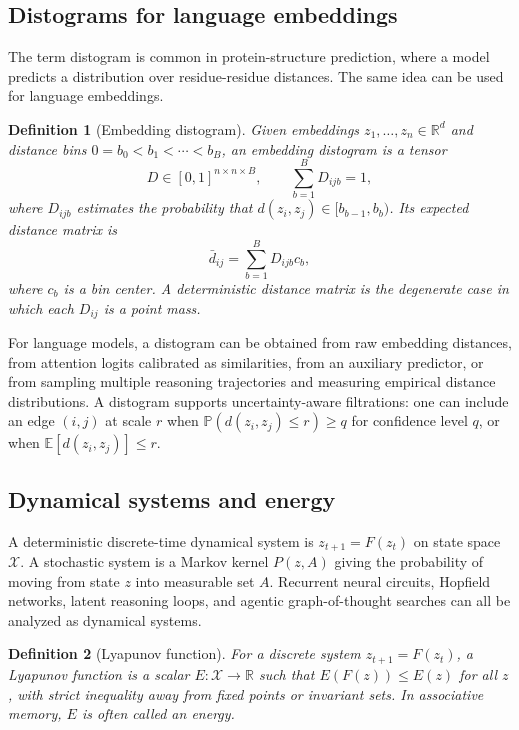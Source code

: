 \documentclass[11pt]{article}
\newtheorem{definition}{Definition}[section]
\newcommand{\R}{\mathbb{R}}
\newcommand{\E}{\mathbb{E}}
\newcommand{\calX}{\mathcal{X}}
\newcommand{\1}{\mathbf{1}}
\begin{document}
\subsection{Distograms for language embeddings}

The term distogram is common in protein-structure prediction, where a model predicts a distribution over residue-residue distances. The same idea can be used for language embeddings.

\begin{definition}[Embedding distogram]
Given embeddings $z_1,\ldots,z_n\in\R^d$ and distance bins $0=b_0<b_1<\cdots<b_B$, an embedding distogram is a tensor
\[
D\in[0,1]^{n\times n\times B},\qquad \sum_{b=1}^B D_{ijb}=1,
\]
where $D_{ijb}$ estimates the probability that $d(z_i,z_j)\in[b_{b-1},b_b)$. Its expected distance matrix is
\[
\bar d_{ij}=\sum_{b=1}^B D_{ijb} c_b,
\]
where $c_b$ is a bin center. A deterministic distance matrix is the degenerate case in which each $D_{ij}$ is a point mass.
\end{definition}

For language models, a distogram can be obtained from raw embedding distances, from attention logits calibrated as similarities, from an auxiliary predictor, or from sampling multiple reasoning trajectories and measuring empirical distance distributions. A distogram supports uncertainty-aware filtrations: one can include an edge $(i,j)$ at scale $r$ when $\mathbb{P}(d(z_i,z_j)\le r)\ge q$ for confidence level $q$, or when $\E[d(z_i,z_j)]\le r$.

\subsection{Dynamical systems and energy}

A deterministic discrete-time dynamical system is $z_{t+1}=F(z_t)$ on state space $\calX$. A stochastic system is a Markov kernel $P(z,A)$ giving the probability of moving from state $z$ into measurable set $A$. Recurrent neural circuits, Hopfield networks, latent reasoning loops, and agentic graph-of-thought searches can all be analyzed as dynamical systems.

\begin{definition}[Lyapunov function]
For a discrete system $z_{t+1}=F(z_t)$, a Lyapunov function is a scalar $E:\calX\to\R$ such that $E(F(z))\le E(z)$ for all $z$, with strict inequality away from fixed points or invariant sets. In associative memory, $E$ is often called an energy.
\end{definition}
\end{document}
